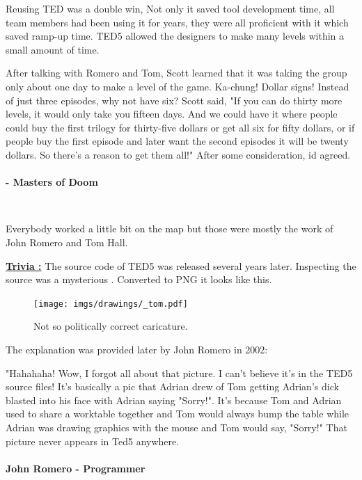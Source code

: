 \documentclass[book.tex]{subfiles}
\begin{document}
Reusing TED was a double win, Not only it saved tool development time, all team members had been using it for years, they were all proficient with it which saved ramp-up time. TED5 allowed the designers to make many levels within a small amount of time.\\
\par

 \begin{fancyquotes}
After talking with Romero and Tom, Scott learned that it was taking the group only about one day to make a level of the game. Ka-chung! Dollar signs! Instead of just three episodes, why not have six? Scott said, "If you can do thirty more levels, it would only take you fifteen days. And we could have it where people could buy the first trilogy for thirty-five dollars or get all six for fifty dollars, or if people buy the first episode and later want the second episodes it will be twenty dollars. So there's a reason to get them all!" After some consideration, id agreed.\\
\\
 \textbf{- Masters of Doom}
 \end{fancyquotes}\\

\par
Everybody worked a little bit on the map but those were mostly the work of John Romero and Tom Hall.\\
\par
 \textbf{\underline{Trivia :}} The source code of TED5 was released several years later. Inspecting the source was a mysterious . Converted to PNG it looks like this.\\
\begin{figure}[H]
\centering
 \texttt{[image: imgs/drawings/\_tom.pdf]}
 \caption{Not so politically correct caricature.} 
 \end{figure}
The explanation was provided later by John Romero in 2002:\\
\par
 \begin{fancyquotes}
   "Hahahaha! Wow, I forgot all about that picture. I can't believe it's 
in the TED5 source files! It's basically a pic that Adrian drew of Tom 
getting Adrian's dick blasted into his face with Adrian saying "Sorry!". 
It's because Tom and Adrian used to share a worktable together and Tom 
would always bump the table while Adrian was drawing graphics with the 
mouse and Tom would say, "Sorry!" That picture never appears in Ted5 
anywhere.\\
   \\
\textbf{John Romero - Programmer}
 \end{fancyquotes}\\
\end{document}
